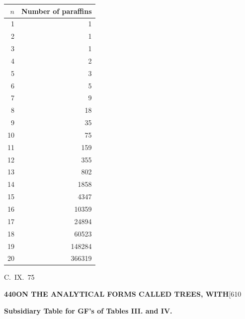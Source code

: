 \documentclass[11pt,a4paper]{article}
\begin{document}
{\begin{center}
\begin{tabular}{|r|r|}
\hline
$n$ & Number of paraffins \\
\hline
1 & 1 \\
2 & 1 \\
3 & 1 \\
4 & 2 \\
5 & 3 \\
6 & 5 \\
7 & 9 \\
8 & 18 \\
9 & 35 \\
10 & 75 \\
11 & 159 \\
12 & 355 \\
13 & 802 \\
14 & 1858 \\
15 & 4347 \\
16 & 10359 \\
17 & 24894 \\
18 & 60523 \\
19 & 148284 \\
20 & 366319 \\
\hline
\end{tabular}
\end{center}
\hfill C.~IX.\ 75

\newpage
\noindent\textbf{440}\hspace{\fill}\textbf{ON THE ANALYTICAL FORMS CALLED TREES, WITH}\hspace{\fill}[610

\noindent\textbf{Subsidiary Table for GF's of Tables III. and IV.}

}
\end{document}
